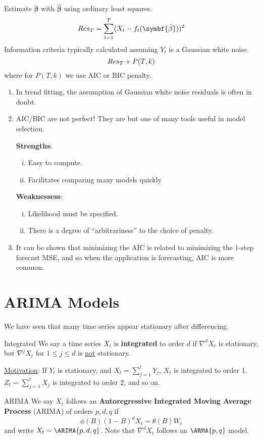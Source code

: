 Estimate $ \symbf{\beta} $ with $ \hat{\symbf{\beta}} $ using ordinary least squares.
\[ \SS{Res}_T=\sum_{t=1}^{T}(X_t-f_t(\symbf{\hat{\beta}}))^2 \]
Information criteria typically calculated assuming $ Y_t $ is a Gaussian white noise.
\[ \relax{Res}_T+P(T,k) \]
where for $ P(T,k) $ we use AIC or BIC penalty.
\begin{Remark}{}{}
    \begin{enumerate}[(1)]
        \item In trend fitting, the assumption of Gaussian white noise residuals is often in doubt.
        \item AIC/BIC are not perfect! They are but one of many tools useful in model selection.

              \textbf{Strengths}:
              \begin{enumerate}[(i)]
                  \item Easy to compute.
                  \item Facilitates comparing many models quickly
              \end{enumerate}
              \textbf{Weaknessess}:
              \begin{enumerate}[(i)]
                  \item Likelihood must be specified.
                  \item There is a degree of ``arbitrariness'' to the choice of penalty.
              \end{enumerate}
        \item It can be shown that minimizing the AIC is related to minimizing
              the $ 1 $-step forecast MSE, and so when the application is forecasting,
              AIC is more common.
    \end{enumerate}
\end{Remark}
\section{ARIMA Models}
We have seen that many time series appear stationary after differencing.
\begin{Definition}{Integrated}{}
    We say a time series $ X_t $ is \textbf{integrated} to order $ d $
    if $ \nabla^d X_t $ is stationary, but $ \nabla^j X_t $
    for $ 1\le j\le d $ is \underline{not} stationary.
\end{Definition}
\underline{Motivation}: If $ Y_t $ is stationary,
and $ X_t=\sum_{j=1}^{t} Y_j $, $ X_t $ is integrated to order 1.
$ Z_t=\sum_{j=1}^{t} X_j $ is integrated to order 2, and so on.
\begin{Definition}{ARIMA}{}
    We say $ X_t $ follows an \textbf{Autoregressive Integrated Moving Average Process}
    (ARIMA) of orders $ p,d,q $ if
    \[ \phi(B)(1-B)^d X_t=\theta(B)W_t \]
    and write $ X_t \sim \ARIMA{p,d,q} $. Note that $ \nabla^d X_t $
    follows an $ \ARMA{p,q} $ model.
\end{Definition}
